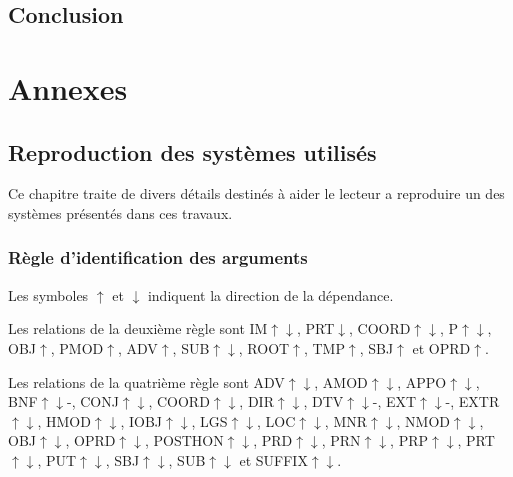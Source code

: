 \documentclass[oneside,parskip]{scrbook}
\begin{document}








\chapter{Conclusion}
\label{ch:conc}

\part{Annexes}

\chapter{Reproduction des systèmes utilisés}

Ce chapitre traite de divers détails destinés à aider le lecteur a reproduire
un des systèmes présentés dans ces travaux.

\section{Règle d'identification des arguments}
\label{argument_identification}

Les symboles $\uparrow$ et $\downarrow$ indiquent la direction de la
dépendance.

Les relations de la deuxième règle sont IM$\uparrow\downarrow$,
PRT$\downarrow$, COORD$\uparrow\downarrow$, P$\uparrow\downarrow$,
OBJ$\uparrow$, PMOD$\uparrow$, ADV$\uparrow$, SUB$\uparrow\downarrow$,
ROOT$\uparrow$, TMP$\uparrow$, SBJ$\uparrow$ et OPRD$\uparrow$.

Les relations de la quatrième règle sont ADV$\uparrow\downarrow$,
AMOD$\uparrow\downarrow$, APPO$\uparrow\downarrow$, BNF$\uparrow\downarrow$-,
CONJ$\uparrow\downarrow$, COORD$\uparrow\downarrow$, DIR$\uparrow\downarrow$,
DTV$\uparrow\downarrow$-, EXT$\uparrow\downarrow$-, EXTR$\uparrow\downarrow$,
HMOD$\uparrow\downarrow$, IOBJ$\uparrow\downarrow$, LGS$\uparrow\downarrow$,
LOC$\uparrow\downarrow$, MNR$\uparrow\downarrow$, NMOD$\uparrow\downarrow$,
OBJ$\uparrow\downarrow$, OPRD$\uparrow\downarrow$, POSTHON$\uparrow\downarrow$,
PRD$\uparrow\downarrow$, PRN$\uparrow\downarrow$, PRP$\uparrow\downarrow$,
PRT$\uparrow\downarrow$, PUT$\uparrow\downarrow$, SBJ$\uparrow\downarrow$,
SUB$\uparrow\downarrow$ et SUFFIX$\uparrow\downarrow$.


\printglossary

\backmatter





\end{document}
